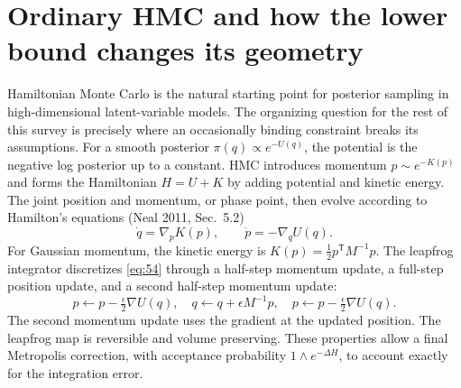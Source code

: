 \documentclass[11pt]{article}
\begin{document}
\section{Ordinary HMC and how the lower bound changes its geometry}\label{sec:hmc}

Hamiltonian Monte Carlo is the natural starting point for posterior sampling in high-dimensional latent-variable models. The organizing question for the rest of this survey is precisely where an occasionally binding constraint breaks its assumptions. For a smooth posterior $\pi(q)\propto e^{-U(q)}$, the potential is the negative log posterior up to a constant. HMC introduces momentum $p\sim e^{-K(p)}$ and forms the Hamiltonian $H=U+K$ by adding potential and kinetic energy. The joint position and momentum, or phase point, then evolve according to Hamilton's equations (Neal 2011, Sec.~5.2)
\begin{equation}\label{eq:54}
 \dot q=\nabla_pK(p),\qquad \dot p=-\nabla_qU(q).
\end{equation}
For Gaussian momentum, the kinetic energy is $K(p)=\frac12p^{\mathsf T}M^{-1}p$. The leapfrog integrator discretizes \eqref{eq:54} through a half-step momentum update, a full-step position update, and a second half-step momentum update:
\begin{equation}\label{eq:55}
 p\leftarrow p-\tfrac\epsilon2\nabla U(q),\quad
 q\leftarrow q+\epsilon M^{-1}p,\quad
 p\leftarrow p-\tfrac\epsilon2\nabla U(q).
\end{equation}
The second momentum update uses the gradient at the updated position. The leapfrog map is reversible and volume preserving. These properties allow a final Metropolis correction, with acceptance probability $1\wedge e^{-\Delta H}$, to account exactly for the integration error.
\end{document}
